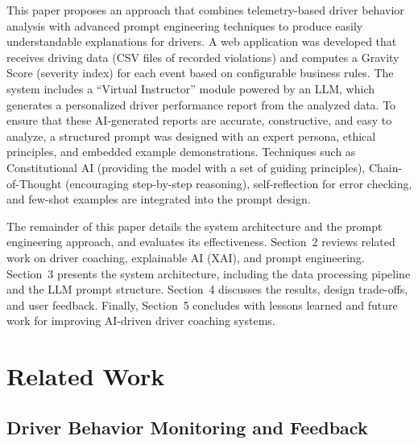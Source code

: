 \documentclass[12pt]{article}
\begin{document}
This paper proposes an approach that combines telemetry-based driver behavior analysis with advanced prompt engineering techniques to produce easily understandable explanations for drivers. A web application was developed that receives driving data (CSV files of recorded violations) and computes a Gravity Score (severity index) for each event based on configurable business rules. The system includes a “Virtual Instructor” module powered by an LLM, which generates a personalized driver performance report from the analyzed data. To ensure that these AI-generated reports are accurate, constructive, and easy to analyze, a structured prompt was designed with an expert persona, ethical principles, and embedded example demonstrations. Techniques such as Constitutional AI (providing the model with a set of guiding principles), Chain-of-Thought (encouraging step-by-step reasoning), self-reflection for error checking, and few-shot examples are integrated into the prompt design.

The remainder of this paper details the system architecture and the prompt engineering approach, and evaluates its effectiveness. Section 2 reviews related work on driver coaching, explainable AI (XAI), and prompt engineering. Section 3 presents the system architecture, including the data processing pipeline and the LLM prompt structure. Section 4 discusses the results, design trade-offs, and user feedback. Finally, Section 5 concludes with lessons learned and future work for improving AI-driven driver coaching systems.

\section{Related Work}

\subsection{Driver Behavior Monitoring and Feedback}
\end{document}
